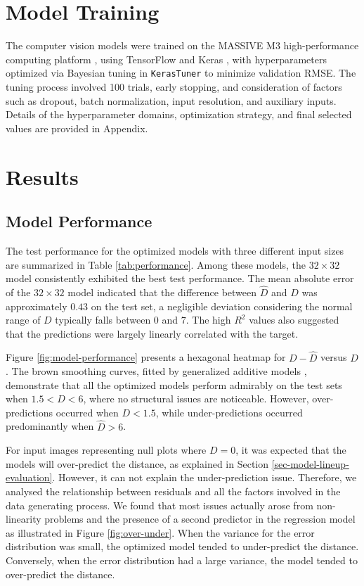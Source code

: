 \documentclass[]{interact}
\theoremstyle{plain}%
\theoremstyle{definition}
\theoremstyle{remark}
\begin{document}
\section{Model Training}\label{sec-model-training}

The computer vision models were trained on the MASSIVE M3
high-performance computing platform \citep{goscinski2014multi}, using
TensorFlow \citep{abadi2016tensorflow} and Keras
\citep{chollet2015keras}, with hyperparameters optimized via Bayesian
tuning in \texttt{KerasTuner} \citep{omalley2019kerastuner} to minimize
validation RMSE. The tuning process involved 100 trials, early stopping,
and consideration of factors such as dropout, batch normalization, input
resolution, and auxiliary inputs. Details of the hyperparameter domains,
optimization strategy, and final selected values are provided in
Appendix.

\section{Results}\label{sec-model-results}

\subsection{Model Performance}\label{model-performance}

The test performance for the optimized models with three different input
sizes are summarized in Table \ref{tab:performance}. Among these models,
the \(32 \times 32\) model consistently exhibited the best test
performance. The mean absolute error of the \(32 \times 32\) model
indicated that the difference between \(\hat{D}\) and \(D\) was
approximately \(0.43\) on the test set, a negligible deviation
considering the normal range of \(D\) typically falls between \(0\) and
\(7\). The high \(R^2\) values also suggested that the predictions were
largely linearly correlated with the target.

Figure \ref{fig:model-performance} presents a hexagonal heatmap for
\(D - \hat{D}\) versus \(D\). The brown smoothing curves, fitted by
generalized additive models \citep{hastie2017generalized}, demonstrate
that all the optimized models perform admirably on the test sets when
\(1.5 < D < 6\), where no structural issues are noticeable. However,
over-predictions occurred when \(D < 1.5\), while under-predictions
occurred predominantly when \(\hat{D} > 6\).

For input images representing null plots where \(D = 0\), it was
expected that the models will over-predict the distance, as explained in
Section \ref{sec-model-lineup-evaluation}. However, it can not explain
the under-prediction issue. Therefore, we analysed the relationship
between residuals and all the factors involved in the data generating
process. We found that most issues actually arose from non-linearity
problems and the presence of a second predictor in the regression model
as illustrated in Figure \ref{fig:over-under}. When the variance for the
error distribution was small, the optimized model tended to
under-predict the distance. Conversely, when the error distribution had
a large variance, the model tended to over-predict the distance.
\end{document}
